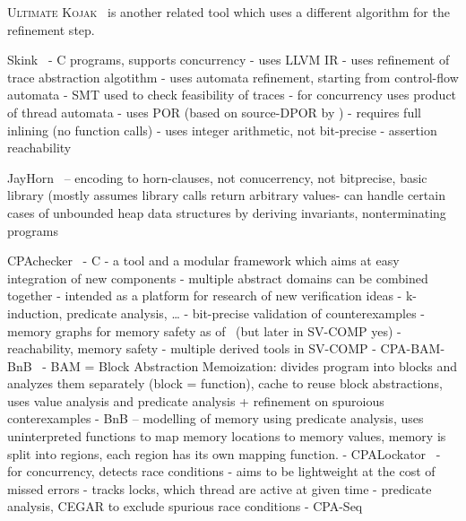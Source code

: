 \textsc{Ultimate Kojak}~\cite{Nutz2015} is another related tool which uses a different algorithm for the refinement step.

Skink~\cite{Cassez2017}
- C programs, supports concurrency
- uses LLVM IR
- uses refinement of trace abstraction algotithm 
  - uses automata refinement, starting from control-flow automata
  - SMT used to check feasibility of traces
  - for concurrency uses product of thread automata
    - uses POR (based on source-DPOR by \cite{Abdulla2014})
- requires full inlining (no function calls)
- uses integer arithmetic, not bit-precise
- assertion reachability

JayHorn~\cite{Kahsai2019}
-- encoding to horn-clauses, not conucerrency, not bitprecise, basic library (mostly assumes library calls return arbitrary values- can handle certain cases of unbounded heap data structures by deriving invariants, nonterminating programs

CPAchecker~\cite{Dangl2015,Beyer2011}
- C
- a tool and a modular framework which aims at easy integration of new components
- multiple abstract domains can be combined together
- intended as a platform for research of new verification ideas
- k-induction, predicate analysis, …
- bit-precise validation of counterexamples
- memory graphs for memory safety as of~\cite{Dangl2015} (but later in SV-COMP yes)
- reachability, memory safety
- multiple derived tools in SV-COMP
  - CPA-BAM-BnB~\cite{Andrianov2017}
    - BAM = Block Abstraction Memoization: divides program into blocks and analyzes them separately (block = function), cache to reuse block abstractions, uses value analysis and predicate analysis + refinement on spuroious conterexamples
    - BnB -- modelling of memory using predicate analysis, uses uninterpreted functions to map memory locations to memory values, memory is split into regions, each region has its own mapping function.
  - CPALockator~\cite{Andrianov2018}
    - for concurrency, detects race conditions
    - aims to be lightweight at the cost of missed errors
    - tracks locks, which thread are active at given time
    - predicate analysis, CEGAR to exclude spurious race conditions
  - CPA-Seq

